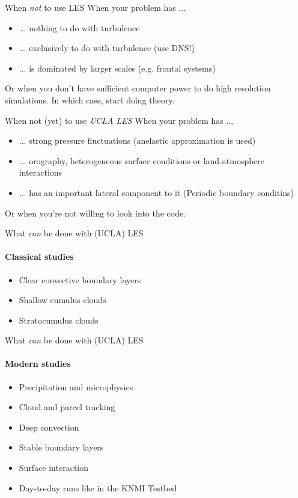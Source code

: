 \documentclass[handout]{beamer}
\begin{document}
\begin{frame}[<+->]{When \emph{not} to use LES}
 When your problem has ...
\begin{itemize}
 \item ... nothing to do with turbulence
 \item ... exclusively to do with turbulence (use DNS!)
 \item ... is dominated by larger scales (e.g. frontal systems)
\end{itemize}
Or when you don't have sufficient computer power to do high resolution simulations. In which case, start doing theory.
\end{frame}
\begin{frame}[<+->]{When not (yet) to use \emph{UCLA LES}}
 When your problem has ...
\begin{itemize}
 \item ... strong pressure fluctuations (anelastic approximation is used)
 \item ... orography, heterogeneous surface conditions or land-atmosphere interactions
 \item ... has an important lateral component to it (Periodic boundary conditins)
\end{itemize}
Or when you're not willing to look into the code.
\end{frame}
\begin{frame}{What \emph{can} be done with (UCLA) LES}
\framesubtitle{Classical studies}
\begin{itemize}
 \item Clear convective boundary layers
 \item Shallow cumulus clouds
 \item Stratocumulus clouds
\end{itemize}
 
\end{frame}
 \begin{frame}
  {What \emph{can} be done with (UCLA) LES}
\framesubtitle{Modern studies}
\begin{itemize}
 \item Precipitation and microphysics
 \item Cloud and parcel tracking
 \item Deep convection
 \item Stable boundary layers
 \item Surface interaction
 \item Day-to-day runs like in the KNMI Testbed
\end{itemize}
 
 \end{frame}
\end{document}
